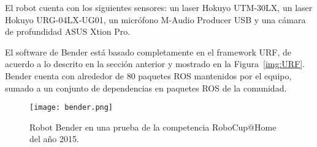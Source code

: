 El robot cuenta con los siguientes sensores: un laser Hokuyo UTM-30LX, un laser Hokuyo URG-04LX-UG01, un micrófono M-Audio Producer USB y una cámara de profundidad ASUS Xtion Pro.

El software de Bender está basado completamente en el framework URF, de acuerdo a lo descrito en la sección anterior y mostrado en la Figura~\ref{img:URF}. Bender cuenta con alrededor de 80 paquetes ROS mantenidos por el equipo, sumado a un conjunto de dependencias en paquetes ROS de la comunidad.

\begin{figure}[!h]
	\centering
	\texttt{[image: bender.png]}
	\caption{\small Robot Bender en una prueba de la competencia RoboCup@Home del año 2015.}
	\label{img:bender}
\end{figure}





